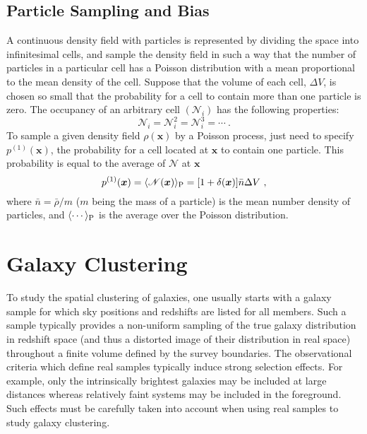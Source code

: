 \documentclass[12pt,a4paper]{article}
\renewcommand{\vec}[1]{\boldsymbol{#1}}
\begin{document}
\subsection{Particle Sampling and Bias}
\cite{2010gfe..book.....M} A continuous density field with particles is represented by dividing the space into infinitesimal cells, and sample the density field in such a way that the number of particles in a particular cell has a Poisson distribution with a mean proportional to the mean density of the cell. Suppose that the volume of each cell, $\Delta V$, is chosen so small that the probability for a cell to contain more than one particle is zero. The occupancy of an arbitrary cell $(\mathscr{N}_i)$ has the following properties:
\begin{equation}
\mathscr{N}_i = \mathscr{N}_i^2 = \mathscr{N}_i^3 = \cdots ~.
\end{equation}
To sample a given density field $\rho(\vec{x})$ by a Poisson process, just need to specify $p^{(1)}(\vec{x})$, the probability for a cell located at $\vec{x}$ to contain one particle. This probability is equal to the average of $\mathscr{N}$ at $\vec{x}$
\begin{equation}
p^{(1)}(\vec{x}) = \langle \mathscr{N}(\vec{x}) \rangle_{\rm P} = [1+\delta(\vec{x})] \bar{n} \Delta V ~,
\end{equation}
where $\bar{n} = \bar{\rho}/m$ ($m$ being the mass of a particle) is the mean number density of particles, and $\langle \cdots \rangle_{\rm P}$ is the average over the Poisson distribution.


\section{Galaxy Clustering}
\cite{2010gfe..book.....M} To study the spatial clustering of galaxies, one usually starts with a galaxy sample for which sky positions and redshifts are listed for all members. Such a sample typically provides a non-uniform sampling of the true galaxy distribution in redshift space (and thus a distorted image of their distribution in real space) throughout a finite volume defined by the survey boundaries.  The observational criteria which define real samples typically induce strong selection effects. For example, only the intrinsically brightest galaxies may be included at large distances whereas relatively faint systems may be included in the foreground. Such effects must be carefully taken into account when using real samples to study galaxy clustering.
\end{document}
